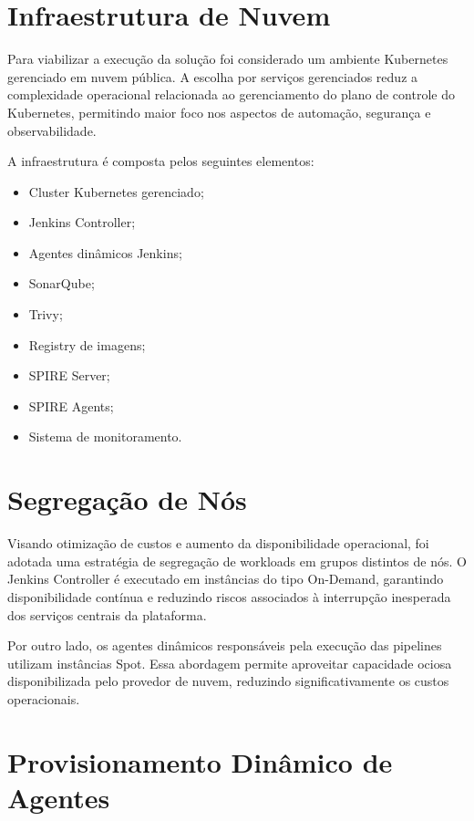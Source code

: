 \section{Infraestrutura de Nuvem}

Para viabilizar a execução da solução foi considerado um ambiente Kubernetes gerenciado em nuvem pública. A escolha por serviços gerenciados reduz a complexidade operacional relacionada ao gerenciamento do plano de controle do Kubernetes, permitindo maior foco nos aspectos de automação, segurança e observabilidade.

A infraestrutura é composta pelos seguintes elementos:

\begin{itemize}
    \item Cluster Kubernetes gerenciado;
    \item Jenkins Controller;
    \item Agentes dinâmicos Jenkins;
    \item SonarQube;
    \item Trivy;
    \item Registry de imagens;
    \item SPIRE Server;
    \item SPIRE Agents;
    \item Sistema de monitoramento.
\end{itemize}

\section{Segregação de Nós}

Visando otimização de custos e aumento da disponibilidade operacional, foi adotada uma estratégia de segregação de workloads em grupos distintos de nós. O Jenkins Controller é executado em instâncias do tipo On-Demand, garantindo disponibilidade contínua e reduzindo riscos associados à interrupção inesperada dos serviços centrais da plataforma.

Por outro lado, os agentes dinâmicos responsáveis pela execução das pipelines utilizam instâncias Spot. Essa abordagem permite aproveitar capacidade ociosa disponibilizada pelo provedor de nuvem, reduzindo significativamente os custos operacionais.

\section{Provisionamento Dinâmico de Agentes}

